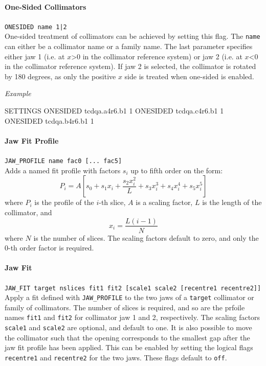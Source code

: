 \paragraph{One-Sided Collimators} \texttt{ONESIDED name 1|2}\\

One-sided treatment of collimators can be achieved by setting this flag.
The \texttt{name} can either be a collimator name or a family name.
The last parameter specifies either jaw 1 (i.e. at $x$>0 in the collimator reference system) or jaw 2 (i.e. at $x$<0 in the collimator reference system).
If jaw 2 is selected, the collimator is rotated by 180 degrees, as only the positive $x$ side is treated when one-sided is enabled.

\bigskip
\noindent\textit{Example}
\begin{cverbatim}
SETTINGS
ONESIDED tcdqa.a4r6.b1    1
ONESIDED tcdqa.c4r6.b1    1
ONESIDED tcdqa.b4r6.b1    1
\end{cverbatim}

\paragraph{Jaw Fit Profile} \texttt{JAW\_PROFILE name fac0 [... fac5]}\\

Adds a named fit profile with factors $s_i$ up to fifth order on the form:
\begin{equation}
    P_i = A\left[s_0 + s_1 x_i + \frac{s_2 x_i^2}{L} + s_3 x_i^3 + s_4 x_i^4 + s_5 x_i^5\right]
\end{equation}
where $P_i$ is the profile of the $i$-th slice, $A$ is a scaling factor, $L$ is the length of the collimator, and
\begin{equation}
    x_i = \frac{L(i-1)}{N}
\end{equation}
where $N$ is the number of slices.
The scaling factors default to zero, and only the $0$-th order factor is required.

\paragraph{Jaw Fit} \texttt{JAW\_FIT target nslices fit1 fit2 [scale1 scale2 [recentre1 recentre2]]}\\

Apply a fit defined with \texttt{JAW\_PROFILE} to the two jaws of a \texttt{target} collimator or family of collimators.
The number of slices is required, and so are the prfoile names \texttt{fit1} and \texttt{fit2} for collimator jaw 1 and 2, respectively.
The scaling factors \texttt{scale1} and \texttt{scale2} are optional, and default to one.
It is also possible to move the collimator such that the opening corresponds to the smallest gap after the jaw fit profile has been applied.
This can be enabled by setting the logical flags \texttt{recentre1} and \texttt{recentre2} for the two jaws.
These flags default to \texttt{off}.

